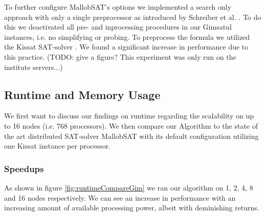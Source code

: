 \documentclass[12pt,a4paper,twoside]{scrartcl}
\numberwithin{equation}{section}
\begin{document}
To further configure MallobSAT's options we implemented a search only approach with only a single preprocessor as introduced by Schreiber et al. \cite{searchOnlyPaper}. To do this we deactivated all pre- and inprocessing procedures in our Gimsatul instances, i.e. no simplifying or probing. To preprocess the formula we utilized the Kissat SAT-solver \cite{kissat}. We found a significant increase in performance due to this practice. (TODO: give a figure? This experiment was only run on the institute servers...)

\subsection{Runtime and Memory Usage}

We first want to discuss our findings on runtime regarding the scalability on up to 16 nodes (i.e. 768 processors). We then compare our Algorithm to the state of the art distributed SAT-solver MallobSAT with its default configuration utilizing one Kissat instance per processor.

\subsubsection{Speedups}

As shown in figure \ref{fig:runtimeCompareGim} we ran our algorithm on 1, 2, 4, 8 and 16 nodes respectively. We can see an increase in performance with an increasing amount of available processing power, albeit with deminishing returns.
\end{document}
